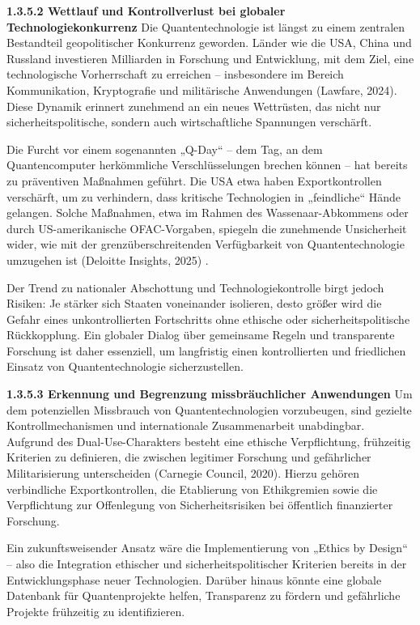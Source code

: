 \textbf{ 1.3.5.2 Wettlauf und Kontrollverlust bei globaler Technologiekonkurrenz} 
Die Quantentechnologie ist längst zu einem zentralen Bestandteil geopolitischer Konkurrenz geworden. Länder wie die USA, China und Russland investieren Milliarden in Forschung und Entwicklung, mit dem Ziel, eine technologische Vorherrschaft zu erreichen – insbesondere im Bereich Kommunikation, Kryptografie und militärische Anwendungen (Lawfare, 2024)\cite{howell_restrict_2023}. Diese Dynamik erinnert zunehmend an ein neues Wettrüsten, das nicht nur sicherheitspolitische, sondern auch wirtschaftliche Spannungen verschärft.

Die Furcht vor einem sogenannten „Q-Day“ – dem Tag, an dem Quantencomputer herkömmliche Verschlüsselungen brechen können – hat bereits zu präventiven Maßnahmen geführt. Die USA etwa haben Exportkontrollen verschärft, um zu verhindern, dass kritische Technologien in „feindliche“ Hände gelangen. Solche Maßnahmen, etwa im Rahmen des Wassenaar-Abkommens oder durch US-amerikanische OFAC-Vorgaben, spiegeln die zunehmende Unsicherheit wider, wie mit der grenzüberschreitenden Verfügbarkeit von Quantentechnologie umzugehen ist (Deloitte Insights, 2025) \cite{buchholz_quantum_nodate}.

Der Trend zu nationaler Abschottung und Technologiekontrolle birgt jedoch Risiken: Je stärker sich Staaten voneinander isolieren, desto größer wird die Gefahr eines unkontrollierten Fortschritts ohne ethische oder sicherheitspolitische Rückkopplung. Ein globaler Dialog über gemeinsame Regeln und transparente Forschung ist daher essenziell, um langfristig einen kontrollierten und friedlichen Einsatz von Quantentechnologie sicherzustellen.

 \textbf{1.3.5.3 Erkennung und Begrenzung missbräuchlicher Anwendungen }
 Um dem potenziellen Missbrauch von Quantentechnologien vorzubeugen, sind gezielte Kontrollmechanismen und internationale Zusammenarbeit unabdingbar. Aufgrund des Dual-Use-Charakters besteht eine ethische Verpflichtung, frühzeitig Kriterien zu definieren, die zwischen legitimer Forschung und gefährlicher Militarisierung unterscheiden (Carnegie Council, 2020)\cite{malekos_smith_preparing_2023}. Hierzu gehören verbindliche Exportkontrollen, die Etablierung von Ethikgremien sowie die Verpflichtung zur Offenlegung von Sicherheitsrisiken bei öffentlich finanzierter Forschung.

Ein zukunftsweisender Ansatz wäre die Implementierung von „Ethics by Design“ – also die Integration ethischer und sicherheitspolitischer Kriterien bereits in der Entwicklungsphase neuer Technologien. Darüber hinaus könnte eine globale Datenbank für Quantenprojekte helfen, Transparenz zu fördern und gefährliche Projekte frühzeitig zu identifizieren.

